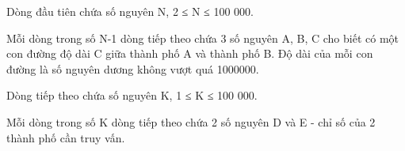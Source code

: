 Dòng đầu tiên chứa số nguyên N, 2 ≤ N ≤ 100 000.  

   Mỗi dòng trong số N-1 dòng tiếp theo chứa 3 số nguyên A, B, C cho biết có một con đường độ dài C giữa thành phố A và thành phố B. Độ dài của mỗi con đường là số nguyên dương không vượt quá 1000000.  

   Dòng tiếp theo chứa số nguyên K, 1 ≤ K ≤ 100 000.  

   Mỗi dòng trong số K dòng tiếp theo chứa 2 số nguyên D và E - chỉ số của 2 thành phố cần truy vấn.